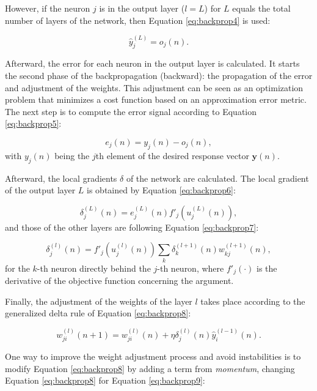 However, if the neuron $j$ is in the output layer ($l = L$) for $L$ equals the total number of layers of the network, then Equation \ref{eq:backprop4} is used:

\begin{equation}
    \label{eq:backprop4}
    \hat{y}_j^{(L)} = o_j (n).
\end{equation}

Afterward, the error for each neuron in the output layer is calculated. It starts the second phase of the backpropagation (backward): the propagation of the error and adjustment of the weights. This adjustment can be seen as an optimization problem that minimizes a cost function based on an approximation error metric. The next step is to compute the error signal according to Equation \ref{eq:backprop5}:

\begin{equation}
    \label{eq:backprop5}
    e_j (n) = y_j(n) - o_j (n),
\end{equation}
with $y_j (n)$ being the $j$th element of the desired response vector $\mathbf{y}(n)$.

Afterward, the local gradients $\delta$ of the network are calculated. The local gradient of the output layer $L$ is obtained by Equation \ref{eq:backprop6}:

\begin{equation}
    \label{eq:backprop6}
    \delta_j^{(L)} (n) = e_j^{(L)}(n) {f}'_j (u_j^{(L)}(n)),
\end{equation}
and those of the other layers are following Equation \ref{eq:backprop7}:

\begin{equation}
    \label{eq:backprop7}
    \delta_j^{(l)} (n) = {f}'_j (u_j^{(l)}(n)) \sum_k \delta_k^{(l+1)} (n) w_{kj}^{(l+1)}(n),
\end{equation}
for the $k$-th neuron directly behind the $j$-th neuron, where ${f}'_j(\cdot)$ is the derivative of the objective function concerning the argument.

Finally, the adjustment of the weights of the layer $l$ takes place according to the generalized delta rule of Equation \ref{eq:backprop8}:

\begin{equation}
    \label{eq:backprop8}
    w_{ji}^{(l)} (n+1) = w_{ji}^{(l)}(n) + \eta \delta_j^{(l)}(n) \hat{y}_i^{(l-1)} (n).
\end{equation}

One way to improve the weight adjustment process and avoid instabilities is to modify Equation \ref{eq:backprop8} by adding a term from \textit{momentum}, changing Equation \ref{eq:backprop8} for Equation \ref{eq:backprop9}:

